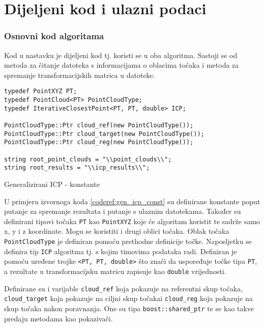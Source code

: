 \section{Dijeljeni kod i ulazni podaci}

\subsubsection{Osnovni kod algoritama}

Kod u nastavku je dijeljeni kod tj. koristi se u oba algoritma. Sastoji se od metoda za čitanje datoteka s informacijama o oblacima točaka i metoda za spremanje transformacijskih matrica u datoteke. 

\begin{listing}[h!]
  \begin{verbatim}
typedef PointXYZ PT;
typedef PointCloud<PT> PointCloudType;
typedef IterativeClosestPoint<PT, PT, double> ICP;

PointCloudType::Ptr cloud_ref(new PointCloudType());
PointCloudType::Ptr cloud_target(new PointCloudType());
PointCloudType::Ptr cloud_reg(new PointCloudType());

string root_point_clouds = "\\point_clouds\\";
string root_results = "\\icp_results\\";
  \end{verbatim}
  \caption{Generalizirani ICP - konstante}
  \label{coderef:gen_icp_const}
\end{listing}

U primjeru izvornoga koda \ref{coderef:gen_icp_const} su definirane konstante poput putanje za spremanje rezultata i putanje s ulaznim datotekama. Također su definirani tipovi točaka \texttt{PT} kao \texttt{PointXYZ} koje će algoritam koristit te sadrže samo x, y i z koordinate. Mogu se koristiti i drugi oblici točaka. Oblak točaka \texttt{PointCloudType} je definiran pomoću prethodne definicije točke. Naposljetku se definira tip \texttt{ICP} algoritma tj. s kojim timovima podataka radi. Definiran je pomoću uređene trojke \texttt{<PT, PT, double>} što znači da uspoređuje točke tipa \texttt{PT}, a rezultate u transformacijsku matricu zapisuje kao \texttt{double} vrijednosti.

Definirane su i varijable \texttt{cloud_ref} koja pokazuje na referentni skup točaka, \texttt{cloud_target} koja pokazuje na ciljni skup točakai \texttt{cloud_reg} koja pokazuje na skup točaka nakon poravnanja. One su tipa \texttt{boost::shared_ptr} te se kao takve predaju metodama kao pokazivači.

